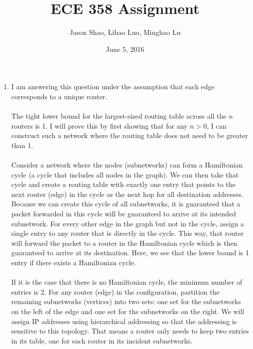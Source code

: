 \documentclass[12pt]{article}
\title{ECE 358 Assignment }
\author{Jason Shao, Lihao Luo, Minghao Lu}
\date{June 5, 2016}
\begin{document}
\maketitle
\renewcommand{\thesubsection}{Problem \arabic{subsection}}


\def\question#1{\item[\bf #1.]}
\def\part#1{\item[\bf #1)]}
\newcommand{\pc}[1]{\mbox{\textbf{#1}}} %

\begin{enumerate}
    \item I am answering this question under the assumption that each edge corresponds to a unique router. \\ \\The tight lower bound for the largest-sized routing table across all the $n$ routers is 1. I will prove this by first showing that for any $n>0$, I can construct such a network where the routing table does not need to be greater than 1.\\ \\ Consider a network where the nodes (subnetworks) can form a Hamiltonian cycle (a cycle that includes all nodes in the graph). We can then take that cycle and create a routing table with exactly one entry that points to the next router (edge) in the cycle as the next hop for all destination addresses. Because we can create this cycle of all subnetworks, it is guaranteed that a packet forwarded in this cycle will be guaranteed to arrive at its intended subnetwork. For every other edge in the graph but not in the cycle, assign a single entry to any router that is directly in the cycle. This way, that router will forward the packet to a router in the Hamiltonian cycle which is then guaranteed to arrive at its destination. Here, we see that the lower bound is 1 entry if there exists a Hamiltonian cycle. \\ \\If it is the case that there is no Hamiltonian cycle, the minimum number of entries is 2. For any router (edge) in the configuration, partition the remaining subnetworks (vertices) into two sets: one set for the subnetworks on the left of the edge and one set for the subnetworks on the right. We will assign IP addresses using  hierarchical addressing so that the addressing is sensitive to this topology. That means a router only needs to keep two entries in its table, one for each router in its incident subnetworks. 
    

\end{enumerate}
\end{document}
